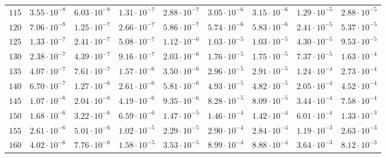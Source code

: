 \begin{landscape}
\begin{table}
\begin{tabular}{lcccccccc}
$	115	$ & $	3.55 \cdot 10^{-8} 	$ & $	6.03 \cdot 10^{-8} 	$ & $	1.31 \cdot 10^{-7} 	$ & $	2.88 \cdot 10^{-7} 	$ & $	3.05 \cdot 10^{-6} 	$ & $	3.15 \cdot 10^{-6} 	$ & $	1.29 \cdot 10^{-5} 	$ & $	2.88 \cdot 10^{-5} 	 $ \\
$	120	$ & $	7.06 \cdot 10^{-8} 	$ & $	1.25 \cdot 10^{-7} 	$ & $	2.66 \cdot 10^{-7} 	$ & $	5.86 \cdot 10^{-7} 	$ & $	5.74 \cdot 10^{-6} 	$ & $	5.83 \cdot 10^{-6} 	$ & $	2.41 \cdot 10^{-5} 	$ & $	5.37 \cdot 10^{-5} 	 $ \\
$	125	$ & $	1.33 \cdot 10^{-7} 	$ & $	2.41 \cdot 10^{-7} 	$ & $	5.08 \cdot 10^{-7} 	$ & $	1.12 \cdot 10^{-6} 	$ & $	1.03 \cdot 10^{-5} 	$ & $	1.03 \cdot 10^{-5} 	$ & $	4.30 \cdot 10^{-5} 	$ & $	9.53 \cdot 10^{-5} 	 $ \\
$	130	$ & $	2.38 \cdot 10^{-7} 	$ & $	4.39 \cdot 10^{-7} 	$ & $	9.16 \cdot 10^{-7} 	$ & $	2.03 \cdot 10^{-6} 	$ & $	1.76 \cdot 10^{-5} 	$ & $	1.75 \cdot 10^{-5} 	$ & $	7.37 \cdot 10^{-5} 	$ & $	1.63 \cdot 10^{-4} 	 $ \\
$	135	$ & $	4.07 \cdot 10^{-7} 	$ & $	7.61 \cdot 10^{-7} 	$ & $	1.57 \cdot 10^{-6} 	$ & $	3.50 \cdot 10^{-6} 	$ & $	2.96 \cdot 10^{-5} 	$ & $	2.91 \cdot 10^{-5} 	$ & $	1.24 \cdot 10^{-4} 	$ & $	2.73 \cdot 10^{-4} 	 $ \\
$	140	$ & $	6.70 \cdot 10^{-7} 	$ & $	1.27 \cdot 10^{-6} 	$ & $	2.61 \cdot 10^{-6} 	$ & $	5.81 \cdot 10^{-6} 	$ & $	4.93 \cdot 10^{-5} 	$ & $	4.82 \cdot 10^{-5} 	$ & $	2.05 \cdot 10^{-4} 	$ & $	4.52 \cdot 10^{-4} 	 $ \\
$	145	$ & $	1.07 \cdot 10^{-6} 	$ & $	2.04 \cdot 10^{-6} 	$ & $	4.19 \cdot 10^{-6} 	$ & $	9.35 \cdot 10^{-6} 	$ & $	8.28 \cdot 10^{-5} 	$ & $	8.09 \cdot 10^{-5} 	$ & $	3.44 \cdot 10^{-4} 	$ & $	7.58 \cdot 10^{-4} 	 $ \\
$	150	$ & $	1.68 \cdot 10^{-6} 	$ & $	3.22 \cdot 10^{-6} 	$ & $	6.59 \cdot 10^{-6} 	$ & $	1.47 \cdot 10^{-5} 	$ & $	1.46 \cdot 10^{-4} 	$ & $	1.42 \cdot 10^{-4} 	$ & $	6.01 \cdot 10^{-4} 	$ & $	1.33 \cdot 10^{-3} 	 $ \\
$	155	$ & $	2.61 \cdot 10^{-6} 	$ & $	5.01 \cdot 10^{-6} 	$ & $	1.02 \cdot 10^{-5} 	$ & $	2.29 \cdot 10^{-5} 	$ & $	2.90 \cdot 10^{-4} 	$ & $	2.84 \cdot 10^{-4} 	$ & $	1.19 \cdot 10^{-3} 	$ & $	2.63 \cdot 10^{-3} 	 $ \\
$	160	$ & $	4.02 \cdot 10^{-6} 	$ & $	7.76 \cdot 10^{-6} 	$ & $	1.58 \cdot 10^{-5} 	$ & $	3.53 \cdot 10^{-5} 	$ & $	8.99 \cdot 10^{-4} 	$ & $	8.88 \cdot 10^{-4} 	$ & $	3.64 \cdot 10^{-3} 	$ & $	8.12 \cdot 10^{-3} 	 $ \\

\end{tabular}
\end{table}
\end{landscape}
